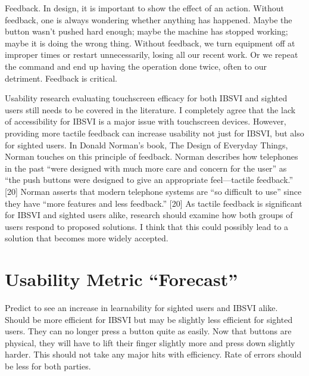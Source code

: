 \documentclass[11pt]{article}
\begin{document}
Feedback. In design, it is important to show the effect of an action. Without feedback, one is always wondering whether anything has happened. Maybe the button wasn't pushed hard enough; maybe the machine has stopped working; maybe it is doing the wrong thing. Without feedback, we turn equipment off at improper times or restart unnecessarily, losing all our recent work. Or we repeat the command and end up having the operation done twice, often to our detriment. Feedback is critical.


Usability research evaluating touchscreen efficacy for both IBSVI and sighted users
still needs to be covered in the literature. I completely agree that the lack of accessibility
for IBSVI is a major issue with touchscreen devices. However, providing more tactile
feedback can increase usability not just for IBSVI, but also for sighted users. In Donald
Norman’s book, The Design of Everyday Things, Norman touches on this principle of
feedback. Norman describes how telephones in the past “were designed with much
more care and concern for the user” as “the push buttons were designed to give an
appropriate feel—tactile feedback.” [20] Norman asserts that modern telephone systems
are “so difficult to use” since they have “more features and less feedback.” [20] As tactile
feedback is significant for IBSVI and sighted users alike, research should examine how
both groups of users respond to proposed solutions. I think that this could possibly
lead to a solution that becomes more widely accepted.


\section{Usability Metric ``Forecast''}
Predict to see an increase in learnability for sighted users and IBSVI alike. Should be more efficient for IBSVI but may be slightly less efficient for sighted users. They can no longer press a button quite as easily. Now that buttons are physical, they will have to lift their finger slightly more and press down slightly harder. This should not take any major hits with efficiency. Rate of errors should be less for both parties.
\clearpage


{}

\end{document}
